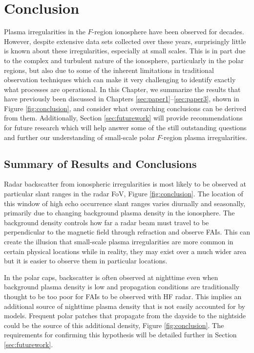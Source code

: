 
\chapter{Conclusion}
\label{sec:conclusion}

Plasma irregularities in the \(F\)-region ionosphere have been observed for decades.  However, despite extensive data sets collected over these years, surprisingly little is known about these irregularities, especially at small scales.  This is in part due to the complex and turbulent nature of the ionosphere, particularly in the polar regions, but also due to some of the inherent limitations in traditional observation techniques which can make it very challenging to identify exactly what processes are operational.  In this Chapter, we summarize the results that have previously been discussed in Chapters \ref{sec:paper1}--\ref{sec:paper3}, shown in Figure \ref{fig:conclusion}, and consider what overarching conclusions can be derived from them.  Additionally, Section \ref{sec:futurework} will provide recommendations for future research which will help answer some of the still outstanding questions and further our understanding of small-scale polar \(F\)-region plasma irregularities.

\section{Summary of Results and Conclusions}
\label{sec:summary}

Radar backscatter from ionospheric irregularities is most likely to be observed at particular slant ranges in the radar FoV, Figure \ref{fig:conclusion}.  The location of this window of high echo occurrence slant ranges varies diurnally and seasonally, primarily due to changing background plasma density in the ionosphere.  The background density controls how far a radar beam must travel to be perpendicular to the magnetic field through refraction and observe FAIs.  This can create the illusion that small-scale plasma irregularities are more common in certain physical locations while in reality, they may exist over a much wider area but it is easier to observe them in particular locations. 

In the polar caps, backscatter is often observed at nighttime even when background plasma density is low and propagation conditions are traditionally thought to be too poor for FAIs to be observed with HF radar.  This implies an additional source of nighttime plasma density that is not easily accounted for by models.  Frequent polar patches that propagate from the dayside to the nightside could be the source of this additional density, Figure \ref{fig:conclusion}.  The requirements for confirming this hypothesis will be detailed further in Section \ref{sec:futurework}.

